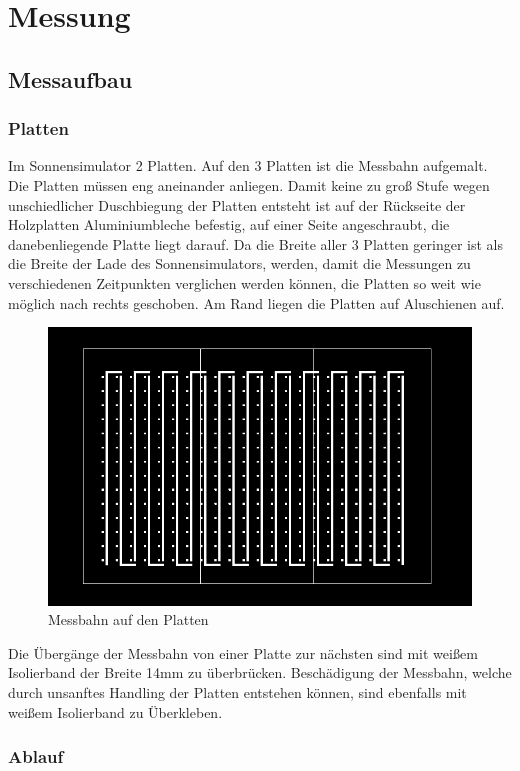 \documentclass[a4paper,bibtotoc,oneside]{scrbook}
\begin{document}
\chapter{Messung}\thispagestyle{empty}
\section{Messaufbau}\thispagestyle{empty}
  \subsection{Platten}\thispagestyle{empty}
Im Sonnensimulator 2 Platten. Auf den 3 Platten ist die Messbahn aufgemalt.
Die Platten müssen eng aneinander anliegen. Damit keine zu groß Stufe wegen unschiedlicher Duschbiegung der Platten entsteht ist auf der Rückseite der Holzplatten Aluminiumbleche befestig, auf einer Seite angeschraubt, die danebenliegende Platte liegt darauf.
Da die Breite aller 3 Platten geringer ist als die Breite der Lade des Sonnensimulators, werden, damit die Messungen zu verschiedenen Zeitpunkten verglichen werden können, die Platten so weit wie möglich nach rechts geschoben. Am Rand liegen die Platten auf Aluschienen auf.
\begin{figure}[htbp]
\centering
\includegraphics[width=125mm]{img/messbahn1.png}
\caption[Messbahn auf den Platten]{Messbahn auf den Platten}\label{bahn}
\end{figure}
Die Übergänge der Messbahn von einer Platte zur nächsten sind mit weißem Isolierband  der Breite 14mm zu überbrücken. Beschädigung der Messbahn, welche durch unsanftes Handling der Platten entstehen können, sind ebenfalls mit weißem Isolierband zu Überkleben.




\subsection{Ablauf}\thispagestyle{empty}
\end{document}
